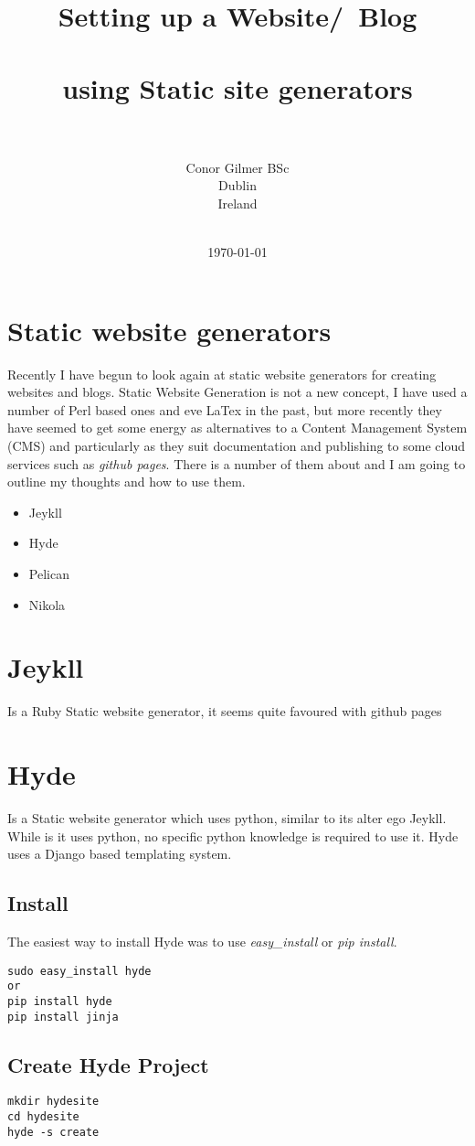 \documentclass[12pt]{article}			%
\title{Setting up a Website/\ Blog\\~\\ using Static site generators\\~\\}	%
\author{	Conor Gilmer BSc\\	%
		Dublin \\
		Ireland \\~\\
		}
\date{\today}				%
\begin{document}
\maketitle
\newpage
\tableofcontents
\newpage

\section{Static website generators}
Recently I have begun to look again at static website generators for creating websites and blogs. Static Website Generation is not a new concept, I have used a number of Perl based ones and eve LaTex in the past, but more recently they have seemed to get some energy as alternatives to a Content Management System (CMS) and particularly as they suit documentation and publishing to some cloud services such as \textit{github pages}. There is a number of them about and I am going to outline my thoughts and how to use them.
\begin{itemize}
\item Jeykll
\item Hyde
\item Pelican
\item Nikola
\end{itemize}


\newpage
\section{Jeykll}
Is a Ruby Static website generator, it seems quite favoured with github pages

\newpage
\section{Hyde}
Is a Static website generator which uses python, similar to its alter ego Jeykll.
While is it uses python, no specific python knowledge is required to use it. Hyde uses a Django based templating system. 

\subsection{Install}
The easiest way to install Hyde was to use \textit{easy\_install} or \textit{pip install}.
\begin{verbatim}
sudo easy_install hyde
or
pip install hyde
pip install jinja
\end{verbatim}

\subsection{Create Hyde Project}
\begin{verbatim}
mkdir hydesite
cd hydesite
hyde -s create

\end{verbatim}
\end{document}
